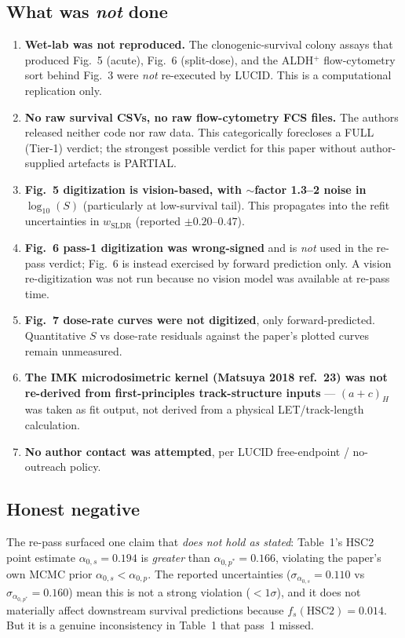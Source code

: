 \documentclass[11pt]{article}
\begin{document}
\subsection{What was \emph{not} done}

\begin{enumerate}
\item \textbf{Wet-lab was not reproduced.} The clonogenic-survival colony assays that produced
      Fig.~5 (acute), Fig.~6 (split-dose), and the ALDH$^{+}$ flow-cytometry sort behind Fig.~3
      were \emph{not} re-executed by LUCID. This is a computational replication only.
\item \textbf{No raw survival CSVs, no raw flow-cytometry FCS files.} The authors released neither
      code nor raw data. This categorically forecloses a FULL (Tier-1) verdict; the strongest
      possible verdict for this paper without author-supplied artefacts is PARTIAL.
\item \textbf{Fig.~5 digitization is vision-based, with $\sim$factor 1.3--2 noise in $\log_{10}(S)$}
      (particularly at low-survival tail). This propagates into the refit uncertainties in
      $w_{\mathrm{SLDR}}$ (reported $\pm 0.20$--$0.47$).
\item \textbf{Fig.~6 pass-1 digitization was wrong-signed} and is \emph{not} used in the re-pass
      verdict; Fig.~6 is instead exercised by forward prediction only. A vision re-digitization
      was not run because no vision model was available at re-pass time.
\item \textbf{Fig.~7 dose-rate curves were not digitized}, only forward-predicted. Quantitative
      $S$ vs dose-rate residuals against the paper's plotted curves remain unmeasured.
\item \textbf{The IMK microdosimetric kernel (Matsuya 2018 ref.~23) was not re-derived from
      first-principles track-structure inputs} --- $(a+c)_H$ was taken as fit output, not derived
      from a physical LET/track-length calculation.
\item \textbf{No author contact was attempted}, per LUCID free-endpoint / no-outreach policy.
\end{enumerate}

\subsection{Honest negative}

The re-pass surfaced one claim that \emph{does not hold as stated}: Table~1's HSC2 point estimate
$\alpha_{0,s} = 0.194$ is \emph{greater} than $\alpha_{0,p^{*}} = 0.166$, violating the paper's
own MCMC prior $\alpha_{0,s} < \alpha_{0,p}$. The reported uncertainties ($\sigma_{\alpha_{0,s}}
= 0.110$ vs $\sigma_{\alpha_{0,p^{*}}} = 0.160$) mean this is not a strong violation
($<1\sigma$), and it does not materially affect downstream survival predictions because
$f_s(\text{HSC2}) = 0.014$. But it is a genuine inconsistency in Table~1 that pass~1 missed.
\end{document}
